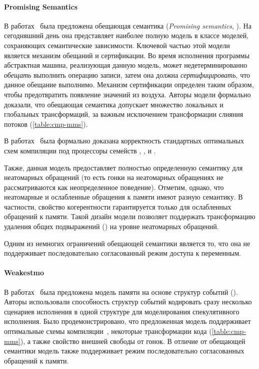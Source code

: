 \paragraph{Promising Semantics}

В работах~\cite{Kang-al:POPL17, Lee-al:PLDI20} была предложена 
обещающая семантика (\emph{Promising semantics}, \PRM).
На сегодняшний день она представляет наиболее полную модель
в классе моделей, сохраняющих семантические зависимости. 
Ключевой частью этой модели является механизм обещаний и сертификации. 
Во время исполнения программы абстрактная машина, 
реализующая данную модель, может недетерминированно 
\emph{обещать} выполнить операцию записи,
затем она должна \emph{сертифицировать}, что данное обещание выполнимо. 
Механизм сертификации определен таким образом, чтобы 
предотвратить появление значений из воздуха. 
Авторы модели формально доказали, 
что обещающая семантика допускает множество 
локальных и глобальных трансформаций, 
за важным исключением трансформации слияния потоков 
(\see \cref{table:cmp-mms}).

В работах~\cite{Podkopaev-al:ECOOP17, Podkopaev-al:POPL19} 
была формально доказана корректность стандартных оптимальных 
схем компиляции под процессоры семейств \Intel, ,  и \POWER.

Также, данная модель предоставляет полностью определенную 
семантику для неатомарных обращений 
(то есть гонки на неатомарных обращениях 
не рассматриваются как неопределенное поведение).
Отметим, однако, что неатомарные и ослабленные обращения 
к памяти имеют разную семантику. 
В частности, свойство когерентности гарантируется только 
для ослабленных обращений к памяти.
Такой дизайн модели позволяет поддержать 
трансформацию удаления общих подвыражений (\CSE)
на уровне неатомарных обращений. 

Одним из немногих ограничений обещающей семантики
является то, что она не поддерживает последовательно согласованный 
режим доступа к переменным. 

\paragraph{Weakestmo}

В работах~\cite{Chakraborty-Vafeiadis:CGO17, Chakraborty-Vafeiadis:POPL19} 
была предложена модель памяти на основе структур событий (\WMO).
Авторы использовали способность структур событий кодировать
сразу несколько сценариев исполнения в одной структуре
для моделирования спекулятивного исполнения. 
Было продемонстрировано, что предложенная модель поддерживает 
оптимальные схемы компиляции~\cite{Moiseenko-al:ECOOP20}, 
некоторые трансформации кода (\see \cref{table:cmp-mms}), 
а также свойство внешней свободы от гонок. 
В отличие от обещающей семантики модель 
также поддерживает режим последовательно согласованных
обращений к памяти. 

